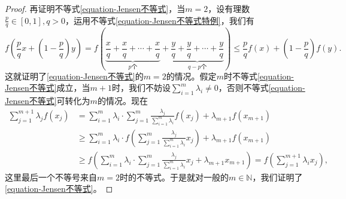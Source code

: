 \documentclass[../../main.tex]{subfiles}%
\begin{document}
\begin{proof}
再证明不等式\eqref{equation-Jensen不等式}，当\(m = 2\)，设有理数\(\frac{p}{q}\in[0,1],q>0\)，运用不等式\eqref{equation-Jensen不等式特例}，我们有
\[
f\left(\frac{p}{q}x+\left(1-\frac{p}{q}\right)y\right)=f\left(\underbrace{\frac{x}{q}+\frac{x}{q}+\cdots+\frac{x}{q}}_{p个}+\underbrace{\frac{y}{q}+\frac{y}{q}+\cdots+\frac{y}{q}}_{q - p个}\right)\leqslant\frac{p}{q}f(x)+\left(1-\frac{p}{q}\right)f(y).
\]
这就证明了\eqref{equation-Jensen不等式}的\(m = 2\)的情况。假定\(m\)时不等式\eqref{equation-Jensen不等式}成立，当\(m + 1\)时，我们不妨设\(\sum_{i = 1}^{m}\lambda_i\neq0\)，否则不等式\eqref{equation-Jensen不等式}可转化为$m$的情况。现在
\begin{align*}
\sum_{j = 1}^{m + 1}\lambda_jf(x_j)&=\sum_{i = 1}^{m}\lambda_i\cdot\sum_{j = 1}^{m}\frac{\lambda_j}{\sum\limits_{i = 1}^{m}\lambda_i}f(x_j)+\lambda_{m+1}f(x_{m + 1})\\
&\geqslant\sum_{i = 1}^{m}\lambda_i\cdot f\left(\sum_{j = 1}^{m}\frac{\lambda_j}{\sum\limits_{i = 1}^{m}\lambda_i}x_j\right)+\lambda_{m+1}f(x_{m + 1})\\
&\geqslant f\left(\sum_{i = 1}^{m}\lambda_i\cdot\sum_{j = 1}^{m}\frac{\lambda_j}{\sum\limits_{i = 1}^{m}\lambda_i}x_j+\lambda_{m+1}x_{m + 1}\right)=f\left(\sum\limits_{j = 1}^{m + 1}\lambda_ix_j\right),
\end{align*}
这里最后一个不等号来自\(m = 2\)时的不等式。于是就对一般的\(m\in\mathbb{N}\)，我们证明了\eqref{equation-Jensen不等式}。

\end{proof}
\end{document}
